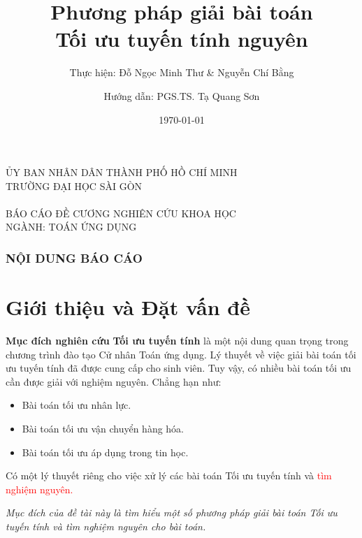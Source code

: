\documentclass[10pt]{beamer}
\title{Phương pháp giải bài toán \\ Tối ưu tuyến tính nguyên}
\date{\today}
\author{Hướng dẫn: PGS.TS. Tạ Quang Sơn}
\institute{Sinh viên lớp: DTU1221, Khóa: 22 @ Đại học Sài Gòn}
\subtitle{Thực hiện: Đỗ Ngọc Minh Thư \& Nguyễn Chí Bằng}
\begin{document}
\begin{frame}
  \centering
  {\footnotesize
  ỦY BAN NHÂN DÂN THÀNH PHỐ HỒ CHÍ MINH\\
  TRƯỜNG ĐẠI HỌC SÀI GÒN}\\
  \phantom{space}\\
  {\normalsize BÁO CÁO ĐỀ CƯƠNG NGHIÊN CỨU KHOA HỌC\\
  NGÀNH: TOÁN ỨNG DỤNG}\\[-50pt]
  \titlepage
\end{frame}

\begin{frame}
    \frametitle{NỘI DUNG BÁO CÁO}
    \tableofcontents
\end{frame}

\section{Giới thiệu và Đặt vấn đề}

\begin{frame}{\bf Mục đích nghiên cứu}
\textbf{Tối ưu tuyến tính} là một nội dung quan trọng trong chương trình đào tạo Cử nhân Toán ứng dụng. Lý thuyết về việc giải bài toán tối ưu tuyến tính đã được cung cấp cho sinh viên. Tuy vậy, có nhiều bài toán tối ưu cần được giải với nghiệm nguyên. Chẳng hạn như:
\begin{itemize}
\item Bài toán tối ưu nhân lực.
\item Bài toán tối ưu vận chuyển hàng hóa.
\item Bài toán tối ưu áp dụng trong tin học.
\end{itemize}

\bigskip
Có một lý thuyết riêng cho việc xử lý các bài toán Tối ưu tuyến tính và \textcolor{red}{tìm nghiệm nguyên.}
\bigskip

{\it Mục đích của đề tài này là tìm hiểu một số phương pháp giải bài toán Tối ưu tuyến tính và tìm nghiệm nguyên cho bài toán.}
\end{frame}
\end{document}
